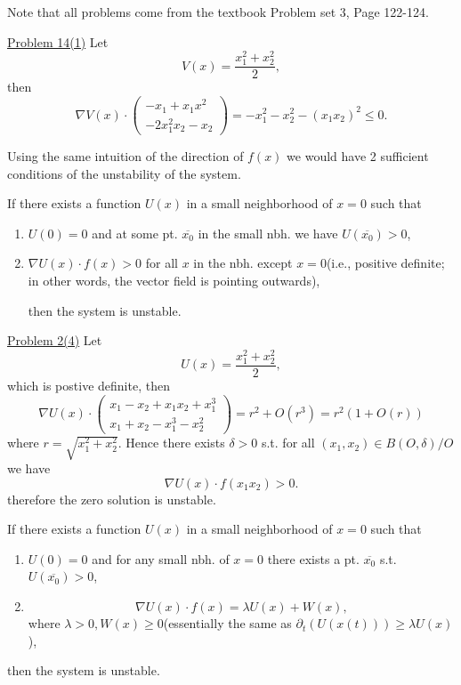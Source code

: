 \documentclass{tufte-handout}
\begin{document}
Note that all problems come from the textbook \cite{2001} Problem set 3, Page 122-124.

\underline{Problem 14(1)} Let \[ V(x)=\frac{x_1^2+x_2^2}{2}, \]
then \[ \nabla V (x) \cdot 
\begin{pmatrix}
	-x_1+x_1x^2 \\
	-2x_1^2 x_2 -x_2
\end{pmatrix}
= 
-x_1^2-x_2^2-(x_1x_2)^2 \leq 0.
\]

Using the same intuition of the direction of $f(x)$ we would have 2 sufficient conditions of the unstability of the system.
\begin{theorem} 
If there exists a function $U(x)$ in a small neighborhood of $x=0$ such that
\begin{enumerate}

	\item $U(0)=0$ and at some pt. $\overline{x_0}$ in the small nbh. we have $U(\overline{x_0}) > 0$,
\item $\nabla U(x) \cdot f(x) > 0$ for all $x$ in the nbh. except $x=0$(i.e., positive definite; in other words, the vector field is pointing outwards),

then the system is unstable.
\end{enumerate}
\end{theorem}
\underline{Problem 2(4)} Let \[ U(x)=\frac{x_1^2+x_2^2}{2}, \]
which is postive definite,
then \[ \nabla U(x) \cdot
\begin{pmatrix}
	x_1-x_2+x_1x_2+x_1^3 \\
	x_1+x_2-x_1^3-x_2^2
	\end{pmatrix}
	= r^2 + O(r^3) = r^2(1+ O(r))
\]
where $r=\sqrt{x_1^2+x_2^2}.$ Hence there exists $\delta> 0$ s.t. for all $(x_1,x_2)\in B(O,\delta)/{O}$ we have \[ \nabla U(x) \cdot f(x_1x_2) >0. \]
therefore the zero solution is unstable.
\begin{theorem} 
If there exists a function $U(x)$ in a small neighborhood of $x=0$ such that
\begin{enumerate}
    \item $U(0)=0$ and for any small nbh. of $x=0$ there exists a pt. $\overline{x_0}$  s.t. $U(\overline{x_0}) > 0$,
    \item \[ \nabla U(x) \cdot f(x) = \lambda U(x)+ W(x), \]
where $\lambda>0, W(x) \geq 0$(essentially the same as $\partial_t (U(x(t))) \geq \lambda U(x)$),
\end{enumerate}

then the system is unstable.
\end{theorem}
\end{document}
